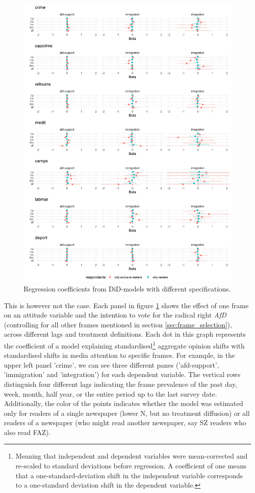 \documentclass{article}
\begin{document}
\begin{figure}
    \centering
    \includegraphics[width=\textwidth]{paper/vis/effectplot_frames_did.png}
    \caption{Regression coefficients from DiD-models with different specifications.}
    \label{fig:did_corr}
\end{figure}

This is however not the case. Each panel in figure \ref{fig:did_corr} shows the effect of one frame on an attitude variable and the intention to vote for the radical right \textit{AfD} (controlling for all other frames mentioned in section \ref{sec:frame_selection}), across different lags and treatment definitions. Each dot in this graph represents the coefficient of a model explaining standardised\footnote{Meaning that independent and dependent variables were mean-corrected and re-scaled to standard deviations before regression. A coefficient of one means that a one-standard-deviation shift in the independent variable corresponds to a one-standard deviation shift in the dependent variable.} aggregate opinion shifts with standardised shifts in media attention to specific frames.  For example, in the upper left panel 'crime', we can see three different panes ('afd-support', 'immigration' and 'integration') for each dependent variable. The vertical rows distinguish four different lags indicating the frame prevalence of the past day, week, month, half year, or the entire period up to the last survey date. Additionally, the color of the points indicates whether the model was estimated only for readers of a single newspaper (lower N, but no treatment diffusion) or all readers of a newspaper (who might read another newspaper, say SZ readers who also read FAZ). 
\end{document}
